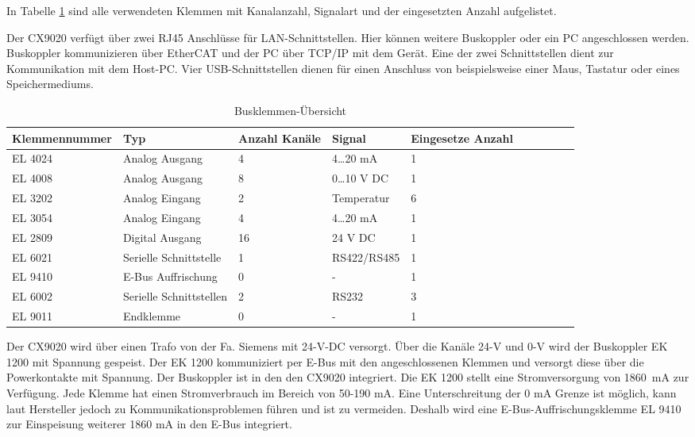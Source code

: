 In Tabelle \ref{tab:Klemmenübersicht} sind alle verwendeten Klemmen mit Kanalanzahl, Signalart und der eingesetzten Anzahl aufgelistet. 

Der CX9020 verfügt über zwei RJ45 Anschlüsse für LAN-Schnittstellen. Hier können weitere Buskoppler oder ein PC angeschlossen werden. Buskoppler kommunizieren über EtherCAT  und der PC über TCP/IP mit dem Gerät. Eine der zwei Schnittstellen dient zur Kommunikation mit dem Host-PC. Vier USB-Schnittstellen dienen für einen Anschluss von beispielsweise einer Maus, Tastatur  oder eines Speichermediums. 

\begin{table}[htb]
\centering
\caption{Busklemmen-Übersicht}\vspace{6pt}
\begin{tabular}{p{2cm}p{3.6cm}p{1.4cm}p{2.8cm}p{3.2cm}ccccc}
\hline 
\rule[-1ex]{0pt}{2.5ex} \textbf{Klemmennummer} & \textbf{Typ} & \textbf{Anzahl Kanäle} & \textbf{Signal} & \textbf{Eingesetze Anzahl} \\ 
\hline 
\hline 
\rule[-1ex]{0pt}{2.5ex} EL 4024 & Analog Ausgang & 4 & 4\dots 20 mA & 1 \\ 
\hline 
\rule[-1ex]{0pt}{2.5ex} EL 4008 & Analog Ausgang & 8 & 0\dots 10 V DC & 1 \\ 
\hline 
\rule[-1ex]{0pt}{2.5ex} EL 3202 & Analog Eingang & 2 & Temperatur & 6 \\ 
\hline 
\rule[-1ex]{0pt}{2.5ex} EL 3054 & Analog Eingang & 4 & 4\dots 20 mA & 1 \\ 
\hline 
\rule[-1ex]{0pt}{2.5ex} EL 2809 & Digital Ausgang & 16 & 24 V DC  & 1 \\ 
\hline 
\rule[-1ex]{0pt}{2.5ex} EL 6021 & Serielle Schnittstelle & 1 &  RS422/RS485 & 1 \\ 
\hline 
\rule[-1ex]{0pt}{2.5ex} EL 9410 & E-Bus Auffrischung & 0 & - & 1 \\ 
\hline 
\rule[-1ex]{0pt}{2.5ex} EL 6002 & Serielle Schnittstellen & 2 & RS232 & 3 \\ 
\hline 
\rule[-1ex]{0pt}{2.5ex} EL 9011 & Endklemme & 0 & - & 1 \\ 
\hline 
\hline 
\end{tabular} 
\label{tab:Klemmenübersicht}
\end{table}



Der CX9020 wird über einen Trafo von der Fa. Siemens mit 24-V-DC versorgt. Über die Kanäle 24-V und 0-V wird der Buskoppler EK 1200 mit Spannung gespeist. Der EK 1200 kommuniziert per E-Bus mit den angeschlossenen Klemmen und versorgt diese über die Powerkontakte mit Spannung.  Der Buskoppler ist in den den CX9020 integriert. Die EK 1200 stellt eine Stromversorgung von \mbox{1860 mA} zur Verfügung.  Jede Klemme hat einen Stromverbrauch im Bereich von 50-190 mA. Eine Unterschreitung der 0 mA Grenze ist möglich, kann laut Hersteller jedoch zu Kommunikationsproblemen führen und ist zu vermeiden. Deshalb wird eine E-Bus-Auffrischungsklemme EL 9410 zur Einspeisung weiterer 1860 mA in den E-Bus integriert. 

